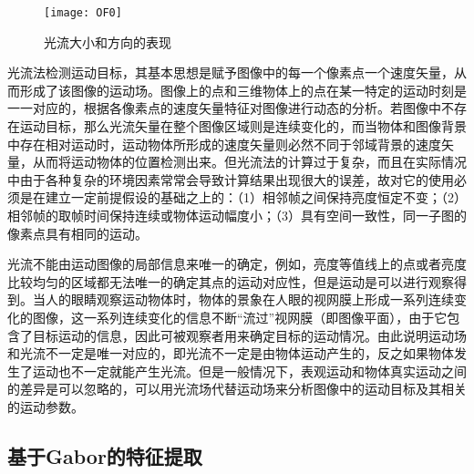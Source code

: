 \begin{figure}[!htbp]
    \centering
    \texttt{[image: OF0]}
    \caption{光流大小和方向的表现}
    \label{fig7}
\end{figure}

光流法检测运动目标，其基本思想是赋予图像中的每一个像素点一个速度矢量，从而形成了该图像的运动场。图像上的点和三维物体上的点在某一特定的运动时刻是一一对应的，根据各像素点的速度矢量特征对图像进行动态的分析。若图像中不存在运动目标，那么光流矢量在整个图像区域则是连续变化的，而当物体和图像背景中存在相对运动时，运动物体所形成的速度矢量则必然不同于邻域背景的速度矢量，从而将运动物体的位置检测出来。但光流法的计算过于复杂，而且在实际情况中由于各种复杂的环境因素常常会导致计算结果出现很大的误差，故对它的使用必须是在建立一定前提假设的基础之上的：（1）相邻帧之间保持亮度恒定不变；（2）相邻帧的取帧时间保持连续或物体运动幅度小；（3）具有空间一致性，同一子图的像素点具有相同的运动。

光流不能由运动图像的局部信息来唯一的确定，例如，亮度等值线上的点或者亮度比较均匀的区域都无法唯一的确定其点的运动对应性，但是运动是可以进行观察得到。当人的眼睛观察运动物体时，物体的景象在人眼的视网膜上形成一系列连续变化的图像，这一系列连续变化的信息不断“流过”视网膜（即图像平面），由于它包含了目标运动的信息，因此可被观察者用来确定目标的运动情况。由此说明运动场和光流不一定是唯一对应的，即光流不一定是由物体运动产生的，反之如果物体发生了运动也不一定就能产生光流。但是一般情况下，表观运动和物体真实运动之间的差异是可以忽略的，可以用光流场代替运动场来分析图像中的运动目标及其相关的运动参数。

\subsection{基于Gabor的特征提取}


